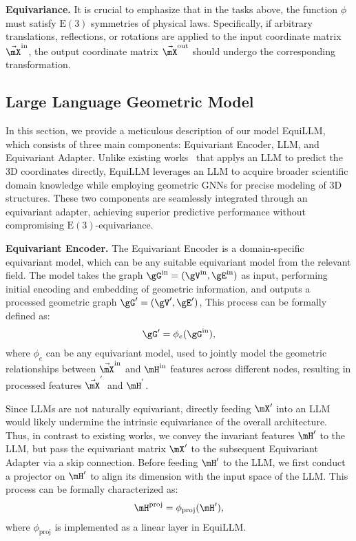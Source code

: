 \textbf{Equivariance.} It is crucial to emphasize that in the tasks above, the function $\phi$ must satisfy $\mathrm{E}(3)$ symmetries of physical laws. Specifically, if arbitrary translations, reflections, or rotations are applied to the input coordinate matrix $\Vec{\mX}^{\text{in}}$, the output coordinate matrix $\Vec{\mX}^{\text{out}}$ should undergo the corresponding transformation.

\subsection{Large Language Geometric Model}
\label{sec:3.2}
In this section, we provide a meticulous description of our model EquiLLM, which consists of three main components: Equivariant Encoder, LLM, and Equivariant Adapter. Unlike existing works~\citep{gruver2024finetuned} that applys an LLM to predict the 3D coordinates directly, EquiLLM leverages an LLM to acquire broader scientific domain knowledge while employing geometric GNNs for precise modeling of 3D structures. These two components are seamlessly integrated through an equivariant adapter, achieving superior predictive performance without compromising $\mathrm{E}(3)$-equivariance.


\textbf{Equivariant Encoder.} The Equivariant Encoder is a domain-specific equivariant model, which can be any suitable equivariant model from the relevant field. The model takes the graph $\gG^{\text{in}} = (\gV^{\text{in}},\gE^{\text{in}})$ as input, performing initial encoding and embedding of geometric information, and outputs a processed geometric graph $\gG' = (\gV',\gE')$, This process can be formally defined as:
\begin{equation}\label{eq:equ_encoder}
\begin{aligned}
    &\gG' = \phi_{e} (\gG^{\text{in}}), \\
\end{aligned}
\end{equation}
where $\phi_{e}$ can be any equivariant model, used to jointly model the geometric relationships between $\Vec{\mX}^{\text{in}}$ and $\mH^{\text{in}}$ features across different nodes, resulting in processed features $\Vec{\mX}^{'}$ and $\mH^{'}$.

Since LLMs are not naturally equivariant, directly feeding $\mX'$ into an LLM would likely undermine the intrinsic equivariance of the overall architecture. Thus, in contrast to existing works, we convey the invariant features $\mH'$ to the LLM, but pass the equivariant matrix $\mX'$ to the subsequent Equivariant Adapter via a skip connection. Before feeding $\mH'$ to the LLM, we first conduct a projector on $\mH'$ to align its dimension with the input space of the LLM. This process can be formally characterized as:
\begin{equation}\label{eq:equ_encoder_proj}
\begin{aligned}
    \mH^{\text{proj}} = \phi_{\text{proj}} (\mH'), \\
\end{aligned}
\end{equation}
where $\phi_{\text{proj}}$ is implemented as a linear layer in EquiLLM.

